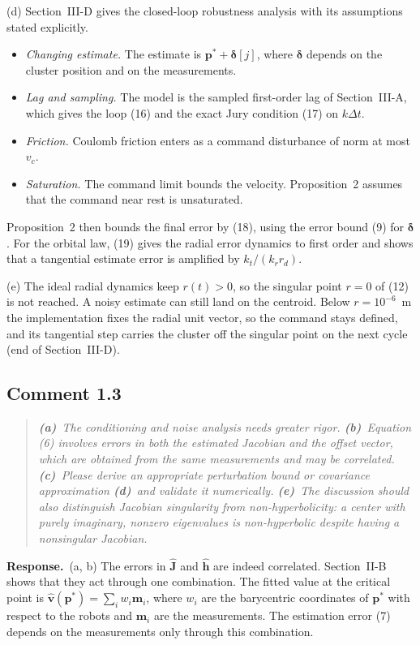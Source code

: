 \documentclass[10pt]{article}
\newcommand{\resp}{\par\textbf{Response.}~}
\begin{document}
(d) Section~III-D gives the closed-loop robustness analysis with its assumptions stated explicitly.
\begin{itemize}
\item \emph{Changing estimate.} The estimate is $\mathbf{p}^* + \boldsymbol{\delta}[j]$, where $\boldsymbol{\delta}$ depends on the cluster position and on the measurements.
\item \emph{Lag and sampling.} The model is the sampled first-order lag of Section~III-A, which gives the loop (16) and the exact Jury condition (17) on $k\Delta t$.
\item \emph{Friction.} Coulomb friction enters as a command disturbance of norm at most $v_c$.
\item \emph{Saturation.} The command limit bounds the velocity. Proposition~2 assumes that the command near rest is unsaturated.
\end{itemize}
Proposition~2 then bounds the final error by (18), using the error bound (9) for $\boldsymbol{\delta}$. For the orbital law, (19) gives the radial error dynamics to first order and shows that a tangential estimate error is amplified by $k_t/(k_r r_d)$.

(e) The ideal radial dynamics keep $r(t) > 0$, so the singular point $r = 0$ of (12) is not reached. A noisy estimate can still land on the centroid. Below $r = 10^{-6}$~m the implementation fixes the radial unit vector, so the command stays defined, and its tangential step carries the cluster off the singular point on the next cycle (end of Section~III-D).

\subsection*{Comment 1.3}

\begin{quote}\itshape
\textbf{(a)}~The conditioning and noise analysis needs greater rigor.
\textbf{(b)}~Equation (6) involves errors in both the estimated Jacobian and the offset vector, which are obtained from the same measurements and may be correlated.
\textbf{(c)}~Please derive an appropriate perturbation bound or covariance approximation
\textbf{(d)}~and validate it numerically.
\textbf{(e)}~The discussion should also distinguish Jacobian singularity from non-hyperbolicity: a center with purely imaginary, nonzero eigenvalues is non-hyperbolic despite having a nonsingular Jacobian.
\end{quote}


\resp (a, b) The errors in $\hat{\mathbf{J}}$ and $\hat{\mathbf{h}}$ are indeed correlated. Section~II-B shows that they act through one combination. The fitted value at the critical point is $\hat{\mathbf{v}}(\mathbf{p}^*) = \sum_i w_i\mathbf{m}_i$, where $w_i$ are the barycentric coordinates of $\mathbf{p}^*$ with respect to the robots and $\mathbf{m}_i$ are the measurements. The estimation error (7) depends on the measurements only through this combination.
\end{document}
